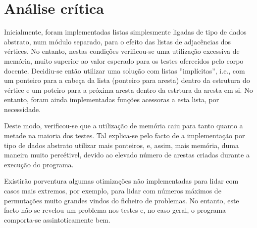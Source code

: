 \documentclass[portuguese, a4paper]{article}
\begin{document}
\section{Análise crítica}
\label{sec:analise}
	\par
	Inicialmente, foram implementadas listas simplesmente ligadas de tipo de
	dados abstrato, num módulo separado, para o efeito das listas de adjacências
	dos vértices. No entanto, nestas condições verificou-se uma utilização
	excessiva de memória, muito superior ao valor esperado para os testes
	oferecidos pelo corpo docente. Decidiu-se então utilizar uma solução com
	listas ''implícitas'', i.e., com um ponteiro para a cabeça da lista
	(ponteiro para aresta) dentro da estrutura do vértice e um poteiro para a
	próxima aresta dentro da estrtura da aresta em si. No entanto, foram ainda
	implementadas funções acessoras a esta lista, por necessidade.
	\par
	Deste modo, verificou-se que a utilização de memória caiu para tanto quanto
	a metade na maioria dos testes. Tal explica-se pelo facto de a implementação
	por tipo de dados abstrato utilizar mais ponteiros, e, assim, mais memória,
	duma maneira muito percétivel, devido ao elevado número de arestas criadas
	durante a execução do programa.
	\par\null\par
	Existirão porventura algumas otimizações não implementadas para lidar com
	casos mais extremos, por exemplo, para lidar com números máximos de
	permutações muito grandes vindos do ficheiro de problemas. No entanto, este
	facto não se revelou um problema nos testes e, no caso geral, o programa
	comporta-se assintoticamente bem.
\end{document}
